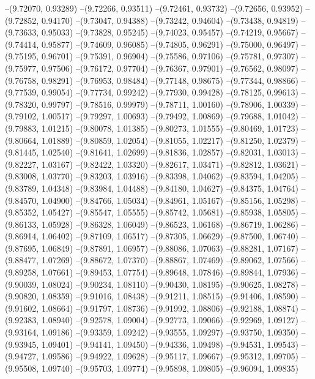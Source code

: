 --(9.72070, 0.93289)
--(9.72266, 0.93511)
--(9.72461, 0.93732)
--(9.72656, 0.93952)
--(9.72852, 0.94170)
--(9.73047, 0.94388)
--(9.73242, 0.94604)
--(9.73438, 0.94819)
--(9.73633, 0.95033)
--(9.73828, 0.95245)
--(9.74023, 0.95457)
--(9.74219, 0.95667)
--(9.74414, 0.95877)
--(9.74609, 0.96085)
--(9.74805, 0.96291)
--(9.75000, 0.96497)
--(9.75195, 0.96701)
--(9.75391, 0.96904)
--(9.75586, 0.97106)
--(9.75781, 0.97307)
--(9.75977, 0.97506)
--(9.76172, 0.97704)
--(9.76367, 0.97901)
--(9.76562, 0.98097)
--(9.76758, 0.98291)
--(9.76953, 0.98484)
--(9.77148, 0.98675)
--(9.77344, 0.98866)
--(9.77539, 0.99054)
--(9.77734, 0.99242)
--(9.77930, 0.99428)
--(9.78125, 0.99613)
--(9.78320, 0.99797)
--(9.78516, 0.99979)
--(9.78711, 1.00160)
--(9.78906, 1.00339)
--(9.79102, 1.00517)
--(9.79297, 1.00693)
--(9.79492, 1.00869)
--(9.79688, 1.01042)
--(9.79883, 1.01215)
--(9.80078, 1.01385)
--(9.80273, 1.01555)
--(9.80469, 1.01723)
--(9.80664, 1.01889)
--(9.80859, 1.02054)
--(9.81055, 1.02217)
--(9.81250, 1.02379)
--(9.81445, 1.02540)
--(9.81641, 1.02699)
--(9.81836, 1.02857)
--(9.82031, 1.03013)
--(9.82227, 1.03167)
--(9.82422, 1.03320)
--(9.82617, 1.03471)
--(9.82812, 1.03621)
--(9.83008, 1.03770)
--(9.83203, 1.03916)
--(9.83398, 1.04062)
--(9.83594, 1.04205)
--(9.83789, 1.04348)
--(9.83984, 1.04488)
--(9.84180, 1.04627)
--(9.84375, 1.04764)
--(9.84570, 1.04900)
--(9.84766, 1.05034)
--(9.84961, 1.05167)
--(9.85156, 1.05298)
--(9.85352, 1.05427)
--(9.85547, 1.05555)
--(9.85742, 1.05681)
--(9.85938, 1.05805)
--(9.86133, 1.05928)
--(9.86328, 1.06049)
--(9.86523, 1.06168)
--(9.86719, 1.06286)
--(9.86914, 1.06402)
--(9.87109, 1.06517)
--(9.87305, 1.06629)
--(9.87500, 1.06740)
--(9.87695, 1.06849)
--(9.87891, 1.06957)
--(9.88086, 1.07063)
--(9.88281, 1.07167)
--(9.88477, 1.07269)
--(9.88672, 1.07370)
--(9.88867, 1.07469)
--(9.89062, 1.07566)
--(9.89258, 1.07661)
--(9.89453, 1.07754)
--(9.89648, 1.07846)
--(9.89844, 1.07936)
--(9.90039, 1.08024)
--(9.90234, 1.08110)
--(9.90430, 1.08195)
--(9.90625, 1.08278)
--(9.90820, 1.08359)
--(9.91016, 1.08438)
--(9.91211, 1.08515)
--(9.91406, 1.08590)
--(9.91602, 1.08664)
--(9.91797, 1.08736)
--(9.91992, 1.08806)
--(9.92188, 1.08874)
--(9.92383, 1.08940)
--(9.92578, 1.09004)
--(9.92773, 1.09066)
--(9.92969, 1.09127)
--(9.93164, 1.09186)
--(9.93359, 1.09242)
--(9.93555, 1.09297)
--(9.93750, 1.09350)
--(9.93945, 1.09401)
--(9.94141, 1.09450)
--(9.94336, 1.09498)
--(9.94531, 1.09543)
--(9.94727, 1.09586)
--(9.94922, 1.09628)
--(9.95117, 1.09667)
--(9.95312, 1.09705)
--(9.95508, 1.09740)
--(9.95703, 1.09774)
--(9.95898, 1.09805)
--(9.96094, 1.09835)
